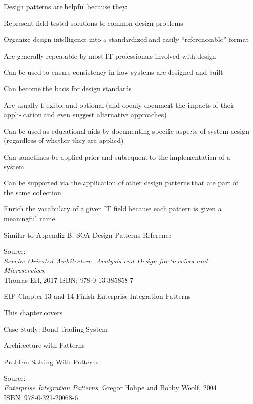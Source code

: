 \documentclass[Screen16to9,17pt]{foils}
\begin{document}
Design patterns are helpful because they:
\begin{list2}
\item Represent field-tested solutions to common design problems
\item Organize design intelligence into a standardized and easily “referenceable” format
\item Are generally repeatable by most IT professionals involved with design
\item Can be used to ensure consistency in how systems are designed and built
\item Can become the basis for design standards
\item Are usually fl exible and optional (and openly document the impacts of their appli-
cation and even suggest alternative approaches)
\item Can be used as educational aids by documenting specific aspects of system design
(regardless of whether they are applied)
\item Can sometimes be applied prior and subsequent to the implementation of a system
\item Can be supported via the application of other design patterns that are part of the
same collection
\item Enrich the vocabulary of a given IT field because each pattern is given a
meaningful name
\end{list2}
Similar to Appendix B: SOA Design Patterns Reference

Source: {\footnotesize\\
\emph{Service‑Oriented Architecture: Analysis and Design for Services and Microservices},\\ Thomas Erl, 2017
ISBN: 978-0-13-385858-7}


EIP Chapter 13 and 14
Finish Enterprise Integration Patterns


This chapter covers
\begin{list2}
\item Case Study: Bond Trading System
\item Architecture with Patterns
\item Problem Solving With Patterns
\end{list2}

Source: {\footnotesize\\
\emph{Enterprise Integration Patterns}, Gregor Hohpe and Bobby Woolf, 2004\\
ISBN: 978-0-321-20068-6}
\end{document}

